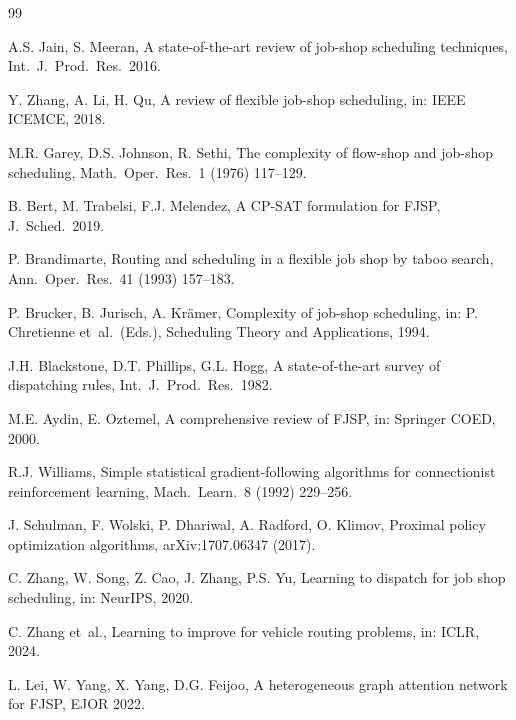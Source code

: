\documentclass[preprint,review,3p,times,twocolumn]{elsarticle}
\newcommand{\etal}{et~al.\!}
\begin{document}


\begin{thebibliography}{99}

A.S. Jain, S. Meeran, A state-of-the-art review of
job-shop scheduling techniques, Int.\ J.\ Prod.\ Res.\ 2016.

Y. Zhang, A. Li, H. Qu, A review of flexible job-shop
scheduling, in: IEEE ICEMCE, 2018.

M.R. Garey, D.S. Johnson, R. Sethi, The complexity of
flow-shop and job-shop scheduling, Math.\ Oper.\ Res.\ 1
(1976) 117--129.

B. Bert, M. Trabelsi, F.J. Melendez, A CP-SAT
formulation for FJSP, J.\ Sched.\ 2019.

P. Brandimarte, Routing and scheduling in a flexible
job shop by taboo search, Ann.\ Oper.\ Res.\ 41 (1993)
157--183.

P. Brucker, B. Jurisch, A. Kr{\"a}mer, Complexity of
job-shop scheduling, in: P. Chretienne \etal\ (Eds.),
Scheduling Theory and Applications, 1994.

J.H. Blackstone, D.T. Phillips, G.L. Hogg, A state-of-the-art
survey of dispatching rules, Int.\ J.\ Prod.\ Res.\ 1982.

M.E. Aydin, E. Oztemel, A comprehensive review of
FJSP, in: Springer COED, 2000.

R.J. Williams, Simple statistical gradient-following
algorithms for connectionist reinforcement learning,
Mach.\ Learn.\ 8 (1992) 229--256.

J. Schulman, F. Wolski, P. Dhariwal, A. Radford, O. Klimov,
Proximal policy optimization algorithms, arXiv:1707.06347 (2017).

C. Zhang, W. Song, Z. Cao, J. Zhang, P.S. Yu, Learning to
dispatch for job shop scheduling, in: NeurIPS, 2020.

C. Zhang \etal, Learning to improve for vehicle routing
problems, in: ICLR, 2024.

L. Lei, W. Yang, X. Yang, D.G. Feijoo, A heterogeneous
graph attention network for FJSP, EJOR 2022.


\end{thebibliography}
\end{document}
